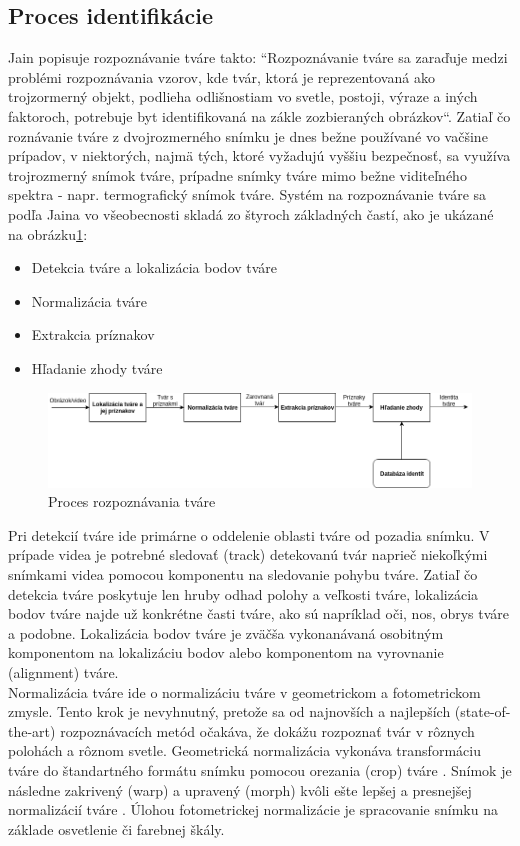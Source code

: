 \subsection{Proces identifikácie}
Jain popisuje rozpoznávanie tváre takto: ``Rozpoznávanie tváre sa zaraďuje medzi problémi rozpoznávania vzorov, kde tvár, ktorá je reprezentovaná ako trojzormerný objekt,
podlieha odlišnostiam vo svetle, postoji, výraze a iných faktoroch, potrebuje byt identifikovaná na zákle zozbieraných obrázkov``\cite{handbookface}.
Zatiaľ čo roznávanie tváre z dvojrozmerného snímku je dnes bežne používané vo vačšine prípadov, v niektorých, najmä tých, ktoré vyžadujú vyššiu bezpečnosť,
sa využíva trojrozmerný snímok tváre,
prípadne snímky tváre mimo bežne viditeľného spektra - napr. termografický snímok tváre.  Systém na rozpoznávanie tváre sa podľa Jaina\cite{handbookface} vo všeobecnosti skladá zo štyroch
základných častí, ako je ukázané na obrázku\ref{fig:workflow}:

\begin{itemize}
	\item Detekcia tváre a lokalizácia bodov tváre
	\item Normalizácia tváre
	\item Extrakcia príznakov
	\item Hľadanie zhody tváre
\end{itemize}

\begin{figure}[H]
	\centering
	\includegraphics[width=1\linewidth]{img/workflow}
	\caption{Proces rozpoznávania tváre}
	\label{fig:workflow}
\end{figure}

\indent  Pri detekcií tváre ide primárne o oddelenie oblasti tváre od pozadia snímku.
V prípade videa je potrebné sledovať (track) detekovanú tvár naprieč niekoľkými snímkami videa pomocou komponentu na sledovanie pohybu tváre.
Zatiaľ čo detekcia tváre poskytuje len hruby odhad polohy a veľkosti tváre, lokalizácia bodov tváre najde už konkrétne časti tváre,
ako sú napríklad oči, nos, obrys tváre a podobne.
Lokalizácia bodov tváre je zväčša vykonanávaná osobitným komponentom na lokalizáciu bodov alebo komponentom na vyrovnanie (alignment) tváre.\\
Normalizácia tváre ide o normalizáciu tváre v geometrickom a fotometrickom zmysle.
Tento krok je nevyhnutný, pretože sa od najnovších a najlepších (state-of-the-art) rozpoznávacích metód očakáva, že dokážu rozpoznať tvár v rôznych polohách a rôznom svetle.
Geometrická normalizácia vykonáva transformáciu tváre do štandartného formátu snímku pomocou orezania (crop) tváre \cite{handbookface}.
Snímok je následne zakrivený (warp) a upravený (morph) kvôli ešte lepšej a presnejšej normalizácií tváre \cite{handbookface}.
Úlohou fotometrickej normalizácie je spracovanie snímku na základe osvetlenie či farebnej škály.\\

